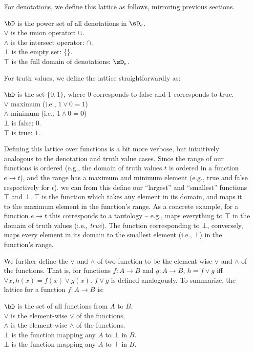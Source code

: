 For denotations, we define this lattice as follows, mirroring previous sections.
\begin{lquote}
$\bD$ is the power set of all denotations in $\sD_e$. \\
$\lor$ is the union operator: $\cup$. \\
$\land$ is the intersect operator: $\cap$. \\
$\bot$ is the empty set: $\{\}$. \\
$\top$ is the full domain of denotations: $\sD_e$.
\end{lquote}

For truth values, we define the lattice straightforwardly as:
\begin{lquote}
$\bD$ is the set $\{0, 1\}$, where 0 corresponds to false and 1 corresponds to true. \\
$\lor$ maximum (i.e., $1 \lor 0 = 1$) \\
$\land$ minimum (i.e., $1 \land 0 = 0$) \\
$\bot$ is false: $0$. \\
$\top$ is true: $1$.
\end{lquote}


Defining this lattice over functions is a bit more verbose, but intuitively analogous
  to the denotation and truth value cases.
Since the range of our functions is ordered (e.g., the domain of truth values $t$ is ordered
  in a function $e \rightarrow t$),
  and the range has a maximum and minimum element (e.g., true and false respectively for $t$),
  we can from this define our ``largest'' and ``smallest'' functions $\top$ and $\bot$.
$\top$ is the function which takes any element in its domain, and maps it to
  the maximum element in the function's range.
As a concrete example, for a function $e \rightarrow t$ this corresponds to a tautology --
  e.g.,  maps everything to $\top$ in the domain of truth values
  (i.e., \textit{true}).
The function corresponding to $\bot$, conversely, maps every element in its domain 
  to the smallest element (i.e., $\bot$) in the function's range.

We further define the $\lor$ and $\land$ of two function to be the element-wise $\lor$
  and $\land$ of the functions.
That is, for functions $f:A \rightarrow B$ and $g:A \rightarrow B$, 
  $h = f \lor g$ iff $\forall x, h(x) = f(x) \lor g(x)$.
$f \lor g$ is defined analogously.
To summarize, the lattice for a function $f:A \rightarrow B$ is:

\begin{lquote}
$\bD$ is the set of all functions from $A$ to $B$. \\
$\lor$ is the element-wise $\lor$ of the functions. \\
$\land$ is the element-wise $\land$ of the functions. \\
$\bot$ is the function mapping any $A$ to $\bot$ in $B$. \\
$\bot$ is the function mapping any $A$ to $\top$ in $B$. \\
\end{lquote}

